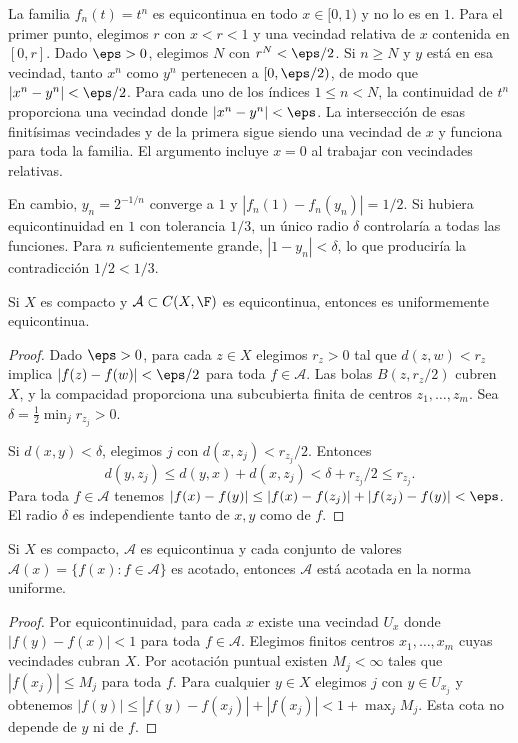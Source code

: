 \begin{ejemplo}
La familia $f_n(t)=t^n$ es equicontinua en todo $x\in[0,1)$ y no lo es en $1$. Para el primer punto, elegimos $r$ con $x<r<1$ y una vecindad relativa de $x$ contenida en $[0,r]$. Dado $\eps>0$, elegimos $N$ con $r^N<\eps/2$. Si $n\ge N$ y $y$ está en esa vecindad, tanto $x^n$ como $y^n$ pertenecen a $[0,\eps/2)$, de modo que $|x^n-y^n|<\eps/2$. Para cada uno de los índices $1\le n<N$, la continuidad de $t^n$ proporciona una vecindad donde $|x^n-y^n|<\eps$. La intersección de esas finitísimas vecindades y de la primera sigue siendo una vecindad de $x$ y funciona para toda la familia. El argumento incluye $x=0$ al trabajar con vecindades relativas.

En cambio, $y_n=2^{-1/n}$ converge a $1$ y
$|f_n(1)-f_n(y_n)|=1/2$. Si hubiera equicontinuidad en $1$ con tolerancia $1/3$, un único radio $\delta$ controlaría a todas las funciones. Para $n$ suficientemente grande, $|1-y_n|<\delta$, lo que produciría la contradicción $1/2<1/3$.
\end{ejemplo}

\begin{proposicion}\label{ch27:equicontuniforme}
Si $X$ es compacto y $\mathcal A\subset C(X,\F)$ es equicontinua, entonces es uniformemente equicontinua.
\end{proposicion}
\begin{proof}
Dado $\eps>0$, para cada $z\in X$ elegimos $r_z>0$ tal que
$d(z,w)<r_z$ implica $|f(z)-f(w)|<\eps/2$ para toda $f\in\mathcal A$. Las bolas $B(z,r_z/2)$ cubren $X$, y la compacidad proporciona una subcubierta finita de centros $z_1,\ldots,z_m$. Sea $\delta=\frac12\min_jr_{z_j}>0$.

Si $d(x,y)<\delta$, elegimos $j$ con $d(x,z_j)<r_{z_j}/2$. Entonces
\[
 d(y,z_j)\le d(y,x)+d(x,z_j)<\delta+r_{z_j}/2\le r_{z_j}.
\]
Para toda $f\in\mathcal A$ tenemos
$|f(x)-f(y)|\le|f(x)-f(z_j)|+|f(z_j)-f(y)|<\eps$. El radio $\delta$ es independiente tanto de $x,y$ como de $f$.
\end{proof}

\begin{proposicion}\label{ch27:acotacioncomun}
Si $X$ es compacto, $\mathcal A$ es equicontinua y cada conjunto de valores $\mathcal A(x)=\{f(x):f\in\mathcal A\}$ es acotado, entonces $\mathcal A$ está acotada en la norma uniforme.
\end{proposicion}
\begin{proof}
Por equicontinuidad, para cada $x$ existe una vecindad $U_x$ donde $|f(y)-f(x)|<1$ para toda $f\in\mathcal A$. Elegimos finitos centros $x_1,\ldots,x_m$ cuyas vecindades cubran $X$. Por acotación puntual existen $M_j<\infty$ tales que $|f(x_j)|\le M_j$ para toda $f$. Para cualquier $y\in X$ elegimos $j$ con $y\in U_{x_j}$ y obtenemos
$|f(y)|\le|f(y)-f(x_j)|+|f(x_j)|<1+\max_jM_j$. Esta cota no depende de $y$ ni de $f$.
\end{proof}

